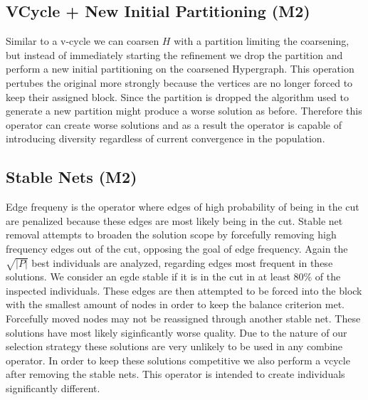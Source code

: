 \documentclass[a4paper,12pt,bibtotoc,titlepage, liststotoc,BCOR7mm,headsepline,pointlessnumbers]{scrbook}
\numberwithin{equation}{section}
\begin{document}
\subsection{VCycle + New Initial Partitioning (M2)}
Similar to a v-cycle we can coarsen $H$ with a partition limiting the coarsening, but instead of immediately starting the refinement we drop the partition and perform a new initial partitioning on the coarsened Hypergraph. This operation pertubes the original more strongly because the vertices are no longer forced to keep their assigned block. Since the partition is
dropped the algorithm used to generate a new partition might produce a worse solution as before. Therefore this operator can create worse solutions and as a result the operator is capable of introducing diversity regardless of current convergence in the population. 
\subsection{Stable Nets (M2)}
Edge frequeny is the operator where edges of high probability of being in the cut are penalized because these edges are most likely being in the cut. Stable net \cite{lim1997large} removal attempts to broaden the solution scope by forcefully removing high frequency edges out of the cut, opposing the goal of edge frequency. Again the $\sqrt{|P|}$ best individuals are analyzed, regarding edges most frequent in these solutions. We consider an egde stable if it is in the cut in at least 80\% of the inspected individuals. These edges are then attempted to be forced into the block with the smallest amount of nodes in order to keep the balance criterion met. Forcefully moved nodes may not be reassigned through another stable net. These solutions have most likely siginficantly worse quality. Due to the nature of our selection strategy these solutions are very unlikely to be used in any combine operator. In order to keep these solutions competitive we also perform a vcycle after removing the stable nets. This operator is intended to create individuals significantly different. 
\end{document}

